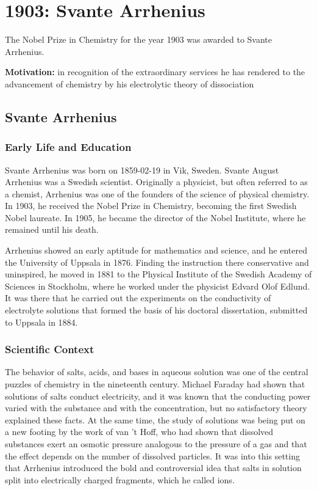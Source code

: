 \chapter{1903: Svante Arrhenius}
\label{chap:chemistry1903}

The Nobel Prize in Chemistry for the year 1903 was awarded to Svante Arrhenius.

\textbf{Motivation:}
in recognition of the extraordinary services he has rendered to the advancement of chemistry by his electrolytic theory of dissociation

\section{Svante Arrhenius}

\subsection*{Early Life and Education}

Svante Arrhenius was born on 1859-02-19 in Vik, Sweden.
Svante August Arrhenius was a Swedish scientist. Originally a physicist, but often referred to as a chemist, Arrhenius was one of the founders of the science of physical chemistry. In 1903, he received the Nobel Prize in Chemistry, becoming the first Swedish Nobel laureate. In 1905, he became the director of the Nobel Institute, where he remained until his death.

Arrhenius showed an early aptitude for mathematics and science, and he entered the University of Uppsala in 1876. Finding the instruction there conservative and uninspired, he moved in 1881 to the Physical Institute of the Swedish Academy of Sciences in Stockholm, where he worked under the physicist Edvard Olof Edlund. It was there that he carried out the experiments on the conductivity of electrolyte solutions that formed the basis of his doctoral dissertation, submitted to Uppsala in 1884.

\subsection*{Scientific Context}

The behavior of salts, acids, and bases in aqueous solution was one of the central puzzles of chemistry in the nineteenth century. Michael Faraday had shown that solutions of salts conduct electricity, and it was known that the conducting power varied with the substance and with the concentration, but no satisfactory theory explained these facts. At the same time, the study of solutions was being put on a new footing by the work of van 't Hoff, who had shown that dissolved substances exert an osmotic pressure analogous to the pressure of a gas and that the effect depends on the number of dissolved particles. It was into this setting that Arrhenius introduced the bold and controversial idea that salts in solution split into electrically charged fragments, which he called ions.

